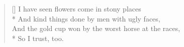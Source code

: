 \documentclass[MAIN]{subfiles}
\begin{document}
\settowidth{\versewidth}{And the wheel's kick \& the wind's song \& the white sail's shaking,}
\begin{verse}[\versewidth]
I have seen flowers come in stony places\\*
And kind things done by men with ugly faces,\\
And the gold cup won by the worst horse at the races,\\*
So I trust, too.
\end{verse}
\end{document}
